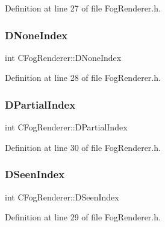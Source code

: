 Definition at line 27 of file Fog\+Renderer.\+h.

\hypertarget{classCFogRenderer_ac4731c0fcb7e73be9fd6839659e519ba}{}\label{classCFogRenderer_ac4731c0fcb7e73be9fd6839659e519ba} 
\subsubsection{\texorpdfstring{D\+None\+Index}{DNoneIndex}}
{\footnotesize\ttfamily int C\+Fog\+Renderer\+::\+D\+None\+Index\hspace{0.3cm}{\ttfamily [protected]}}



Definition at line 28 of file Fog\+Renderer.\+h.

\hypertarget{classCFogRenderer_aa445569ee9f7ede85d5c2cd4fd9d6fca}{}\label{classCFogRenderer_aa445569ee9f7ede85d5c2cd4fd9d6fca} 
\subsubsection{\texorpdfstring{D\+Partial\+Index}{DPartialIndex}}
{\footnotesize\ttfamily int C\+Fog\+Renderer\+::\+D\+Partial\+Index\hspace{0.3cm}{\ttfamily [protected]}}



Definition at line 30 of file Fog\+Renderer.\+h.

\hypertarget{classCFogRenderer_acac9ab2c0a8023661ab1aa096d713458}{}\label{classCFogRenderer_acac9ab2c0a8023661ab1aa096d713458} 
\subsubsection{\texorpdfstring{D\+Seen\+Index}{DSeenIndex}}
{\footnotesize\ttfamily int C\+Fog\+Renderer\+::\+D\+Seen\+Index\hspace{0.3cm}{\ttfamily [protected]}}



Definition at line 29 of file Fog\+Renderer.\+h.

\hypertarget{classCFogRenderer_af9f3956c6e371f112ee1ce5decd7ae89}{}\label{classCFogRenderer_af9f3956c6e371f112ee1ce5decd7ae89} 
